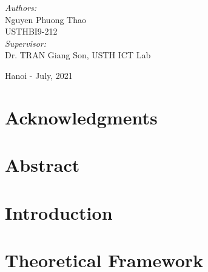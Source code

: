 \documentclass[12pt, twoside]{book}
\begin{document}
\begin{center}
  \vspace*{0.5cm}
  { \large 
    \emph{Authors:} \\	
      {Nguyen Phuong Thao} \\
      {USTHBI9-212} \\
    \vspace*{1.5cm}
    \emph{Supervisor:} \\													
      Dr. TRAN Giang Son, USTH ICT Lab \\
  }
  

  \begin{center}
    {Hanoi - July, 2021}
  \end{center}
  
\end{center}
																		


\frontmatter

\chapter{Acknowledgments}
\label{chap:acknowledgments}


\chapter{Abstract}
\label{chap:abstract}


\tableofcontents 

% 

\listoftables
\listoffigures


\mainmatter

\chapter{Introduction}
\label{chap:intro}


\chapter{Theoretical Framework}
\label{chap:theory}

\end{document}
